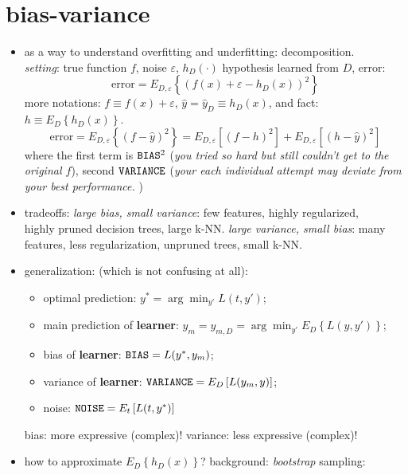 \documentclass{article}
\begin{document}
\section{bias-variance}
\begin{itemize}
	\item as a way to understand overfitting and underfitting: decomposition. \\
		{\it setting}: true function $f$, noise $\varepsilon$, $h_D(\cdot)$
		hypothesis learned from $D$, error: 
		\begin{equation}
			\text{error}=E_{D,\varepsilon}\left\{\left(f(x)+\varepsilon-h_D(x)\right)^2\right\}
		\end{equation}
		more notations: $f\equiv f(x)+\varepsilon$, $\hat y=\hat y_D\equiv h_D(x)$, 
		and fact: $h\equiv E_D\left\{h_D(x)\right\}$.
		\begin{equation}
			\text{error}=E_{D,\varepsilon}\left\{\left(f-\hat y\right)^2\right\}
			=E_{D,\varepsilon}\left[\left(f-h\right)^2\right]+
			E_{D,\varepsilon}\left[\left(h-\hat y\right)^2\right]
		\end{equation}
		where the first term is ${\tt BIAS}^2$ ({\it you tried so hard but still couldn't 
			get to the original $f$}), second ${\tt VARIANCE}$ ({\it your each individual attempt
			may deviate from your best performance. }) 
	\item tradeoffs: {\it large bias, small variance}: few features, highly regularized, \\
		highly pruned decision trees, large k-NN. {\it large variance, small bias}: many 
		features, less regularization, unpruned trees, small k-NN. 
	\item generalization: (which is not confusing at all): 
		\begin{itemize}
			\item optimal prediction: $y^*=\arg\min_{y'}L(t,y')$;
			\item main prediction of {\bf learner}:
				$y_m=y_{m,D}=\arg\min_{y'}E_D\left\{L(y,y')\right\}$;
			\item bias of {\bf learner}: ${\tt BIAS} = L(y^*,y_m)$;
			\item variance of {\bf learner}: ${\tt VARIANCE}=E_D\left[L(y_m,y)\right]$;
			\item noise: ${\tt NOISE}=E_t\left[L(t,y^*)\right]$
		\end{itemize}
		bias: more expressive (complex)! variance: less expressive (complex)!
	\item how to approximate $E_D\left\{h_D(x)\right\}$? background: {\it bootstrap} sampling: \\

\end{itemize}
\end{document}
